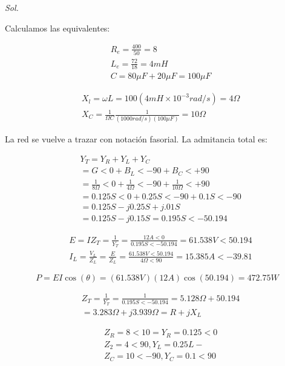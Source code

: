 \textit{ Sol. }

Calculamos las equivalentes:

\begin{align*}
	 & R_e=\frac{400}{50}=8        \\
	 & L_e=\frac{72}{18}=4mH       \\
	 & C= 80\mu F+20\mu F=100\mu F
\end{align*}

\begin{align*}
	 & X_l=\omega L=100(4mH \times 10^{-3}rad/s)=4\Omega              \\
	 & X_C=\frac{1}{\Omega C}\frac{1}{(1000rad/s)(100\mu F)}=10\Omega
\end{align*}

La red se vuelve a trazar con notación fasorial. La admitancia total es:

\begin{align*}
	 & Y_T=Y_R+Y_L+Y_C                                                   \\
	 & =G<0+B_L<-90+B_C<+90                                              \\
	 & =\frac{1}{8\Omega}<0+\frac{1}{4\Omega}<-90+\frac{1}{10\Omega}<+90 \\
	 & =0.125S<0+0.25S<-90+0.1S<-90                                      \\
	 & =0.125S-j0.25S+j.01S                                              \\
	 & =0.125S-j0.15S=0.195S<-50.194
\end{align*}

\begin{align*}
	 & E=IZ_T=\frac{1}{Y_T}=\frac{12A<0}{0.195S<-50.194}=61.538V<50.194                   \\
	 & I_L=\frac{V_L}{Z_L}=\frac{E}{Z_L}=\frac{61.538V<50.194}{4\Omega<90}=15.385A<-39.81
\end{align*}

\begin{equation*}
	P=EI\cos(\theta)=(61.538V)(12A)\cos(50.194)=472.75W
\end{equation*}

\begin{align*}
	 & Z_T=\frac{1}{Y_T}=\frac{1}{0.195S<-50.194}=5.128\Omega+50.194 \\
	 & =3.283\Omega+j3.939\Omega=R+jX_L
\end{align*}

\begin{align*}
	 & Z_R=8<10=Y_R=0.125<0   \\
	 & Z_2=4<90, Y_L=0.25L-   \\
	 & Z_C=10<-90, Y_C=0.1<90
\end{align*}

